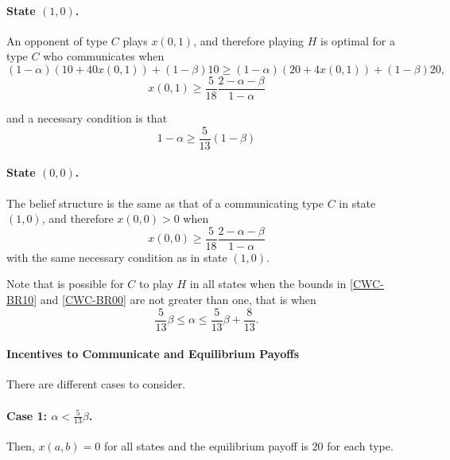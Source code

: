 \documentclass[12pt]{article}
\theoremstyle{break}
\begin{document}
\paragraph{State $(1,0)$.} An opponent of type $C$ plays $x(0,1)$, and therefore playing $H$ is optimal for a type $C$ who communicates when
\[
(1-\alpha)(10+40x(0,1))+(1-\beta) 10 \geq (1-\alpha)(20+4x(0,1))+(1-\beta) 20,
\]
\begin{equation}\label{CWC-BR10}
	x(0,1)\geq \frac{5}{18}\frac{2-\alpha-\beta}{1-\alpha}
\end{equation}

and a necessary condition is that 
\[
1-\alpha\geq \frac{5}{13}(1-\beta)
\]
%
\paragraph{State $(0,0)$.} The belief structure is the same as that of a communicating type $C$ in state $(1,0)$, and therefore $x(0,0)>0$ when
\begin{equation}\label{CWC-BR00}
	x(0,0)\geq \frac{5}{18}\frac{2-\alpha-\beta}{1-\alpha}
\end{equation}
with the same necessary condition as in state $(1,0)$.

Note that is possible for $C$ to play $H$ in all states when the bounds in \eqref{CWC-BR10} and \eqref{CWC-BR00} are not greater than one, that is when
\begin{equation}\label{xij>0-CWC}
	\frac{5}{13}\beta\leq \alpha \leq \frac{5}{13}\beta+\frac{8}{13}.
\end{equation}
%
\paragraph{Incentives to Communicate and Equilibrium Payoffs}
There are different cases to consider.

\paragraph{Case 1: $\alpha<\frac{5}{13}\beta$.} Then, $x(a,b)=0$ for all states and the equilibrium payoff is $20$ for each type.
\end{document}
